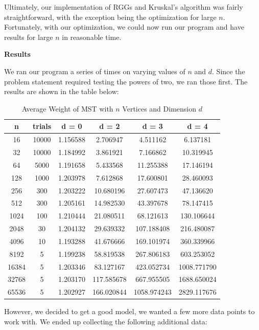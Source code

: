 \documentclass[12pt]{article}
\begin{document}
Ultimately, our implementation of RGGs and Kruskal's algorithm was fairly straightforward, with the exception being the optimization for large $n$. Fortunately, with our optimization, we could now run our program and have results for large $n$ in reasonable time. \\

\bigskip

\pagebreak

\textbf{Results}

We ran our program a series of times on varying values of $n$ and $d$. Since the problem statement required testing the powers of two, we ran those first. The results are shown in the table below: \\

\begin{table}[h!]
\centering
\caption{Average Weight of MST with $n$ Vertices and Dimension $d$}
\begin{tabular} {c | c | c | c | c | c  }
n&trials&d = 0&d = 2&d = 3&d = 4\\ \hline
16&10000&1.156588&2.706947&4.511162&6.137181\\
32&10000&1.184992&3.861921&7.166862&10.319945\\
64&5000&1.191658&5.433568&11.255388&17.146194\\
128&1000&1.203978&7.612868&17.600801&28.460093\\
256&300&1.203222&10.680196&27.607473&47.136620\\
512&300&1.205161&14.982530&43.397678&78.147415\\
1024&100&1.210444&21.080511&68.121613&130.106644\\
2048&30&1.204132&29.639332&107.188408&216.480087\\
4096&10&1.193288&41.676666&169.101974&360.339966\\
8192&5&1.199238&58.819538&267.806183&603.253052\\
16384&5&1.203346&83.127167&423.052734&1008.771790\\
32768&5&1.203170&117.585678&667.955505&1688.650024\\
65536&5&1.202927&166.020844&1058.974243&2829.117676\\
\end{tabular}
\label{table:1}
\end{table}

However, we decided to get a good model, we wanted a few more data points to work with. We ended up collecting the following additional data:
\end{document}
